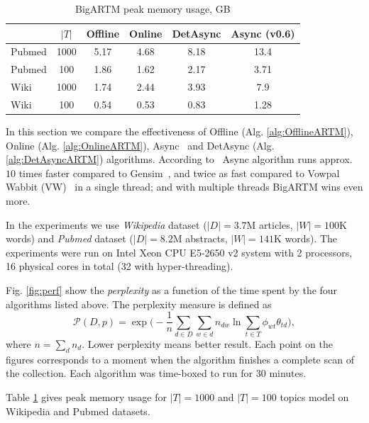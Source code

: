 \documentclass[russian,english]{llncs}
\newcommand{\kw}[1]{\mbox{\textsf{#1}}}
\begin{document}
\begin{table}[t]
	\caption{
		BigARTM peak memory usage, GB
	}
	\label{tab:memory}
	\centering\tabcolsep=4.3pt
	\begin{tabular}[t]{|l|ccccc|}
		\hline
		& $|T|$ & Offline   & Online    & DetAsync     & Async (\kw{v0.6})  \\
		\hline
		Pubmed & {1000}	& {5.17}   	& {4.68}   	& {8.18}   	& {13.4}      \\
		Pubmed & {100}	& {1.86}   	& {1.62}   	& {2.17}   	& {3.71}      \\
		Wiki   & {1000}	& {1.74}   	& {2.44}   	& {3.93}   	& {7.9}       \\ 
		Wiki   & {100}	& {0.54}   	& {0.53}   	& {0.83}   	& {1.28}       \\ 
		\hline
	\end{tabular}
\end{table}

In this section we compare the effectiveness of
\kw{Offline} (Alg. \ref{alg:OfflineARTM}),
\kw{Online} (Alg. \ref{alg:OnlineARTM}),
\kw{Async}~\cite{vfardi15aist} and
\kw{DetAsync} (Alg. \ref{alg:DetAsyncARTM}) algorithms.
According to~\cite{vfardi15aist} \kw{Async} algorithm
runs approx. $10$ times faster compared to Gensim~\cite{rehurek10software},
and twice as fast compared to
Vowpal Wabbit (VW)~\cite{langford07vw}
in a single thread;
and with multiple threads BigARTM wins even more.

In the experiments we use \emph{Wikipedia} dataset ($|D| = 3.7$M articles, $|W| = 100$K words)
and \emph{Pubmed} dataset ($|D| = 8.2$M abstracts, $|W| = 141$K words).
The experiments were run on Intel Xeon CPU E5-2650 v2 system with 2 processors, 16 physical cores in total (32 with hyper-threading).


Fig. \ref{fig:perf} show the \emph{perplexity} as a function of the time spent by the four algorithms listed above.
The perplexity measure is defined as
\begin{equation}
\label{eq:perplexity}
\mathscr{P}(D, p) =
\exp \biggl( - \frac{1}{n} \sum_{d \in D} \sum_{w \in d} n_{dw} \ln \sum_{t\in T} \phi_{wt} \theta_{td} \biggr),
\end{equation}
 where $n = \sum_d n_d$. Lower perplexity means better result.
Each point on the figures corresponds to a moment when the algorithm finishes a complete scan of the collection.
Each algorithm was time-boxed to run for $30$ minutes.

Table \ref{tab:memory} gives peak memory usage for $|T| = 1000$ and $|T|=100$ topics model on Wikipedia and Pubmed datasets.
\end{document}

